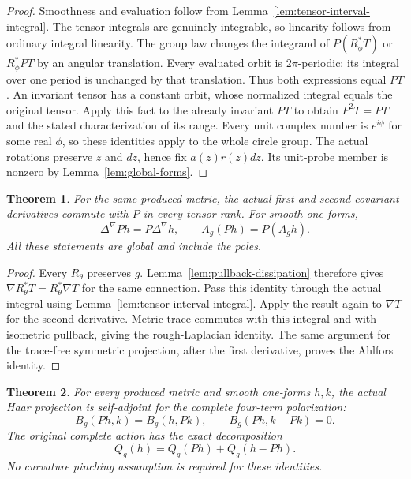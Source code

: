 \documentclass[11pt]{article}
\newtheorem{theorem}{Theorem}[section]
\begin{document}
\begin{proof}
Smoothness and evaluation follow from Lemma~\ref{lem:tensor-interval-integral}.
The tensor integrals are genuinely integrable, so linearity follows from
ordinary integral linearity. The group law changes the integrand of
$P(R_\phi^*T)$ or $R_\phi^*PT$ by an angular translation. Every evaluated
orbit is $2\pi$-periodic; its integral over one period is unchanged by
that translation. Thus both expressions equal $PT$.
An invariant tensor has a constant orbit, whose normalized integral
equals the original tensor. Apply this fact to the already invariant
$PT$ to obtain $P^2T=PT$ and the stated characterization of its range.
Every unit complex number is $e^{i\phi}$ for some real $\phi$, so these
identities apply to the whole circle group. The actual rotations preserve
$z$ and $dz$, hence fix $a(z)r(z)dz$. Its unit-probe member is nonzero
by Lemma~\ref{lem:global-forms}.
\end{proof}

\begin{theorem}\label{thm:haar-derivatives}
For the same produced metric, the actual first and second covariant
derivatives commute with $P$ in every tensor rank. For smooth one-forms,
\[
 \Delta^\nabla Ph=P\Delta^\nabla h,\qquad A_g(Ph)=P(A_gh).
\]
All these statements are global and include the poles.
\end{theorem}

\begin{proof}
Every $R_\theta$ preserves $g$. Lemma~\ref{lem:pullback-dissipation}
therefore gives $\nabla R_\theta^*T=R_\theta^*\nabla T$ for the same
connection. Pass this identity through the actual integral using
Lemma~\ref{lem:tensor-interval-integral}. Apply the result again to
$\nabla T$ for the second derivative. Metric trace commutes with this
integral and with isometric pullback, giving the rough-Laplacian identity.
The same argument for the trace-free symmetric projection, after the
first derivative, proves the Ahlfors identity.
\end{proof}

\begin{theorem}\label{thm:haar-split}
For every produced metric and smooth one-forms $h,k$, the actual Haar
projection is self-adjoint for the complete four-term polarization:
\[
 B_g(Ph,k)=B_g(h,Pk),\qquad B_g(Ph,k-Pk)=0.
\]
The original complete action has the exact decomposition
\begin{equation}\label{eq:haar-action-split}
 Q_g(h)=Q_g(Ph)+Q_g(h-Ph).
\end{equation}
No curvature pinching assumption is required for these identities.
\end{theorem}
\end{document}

